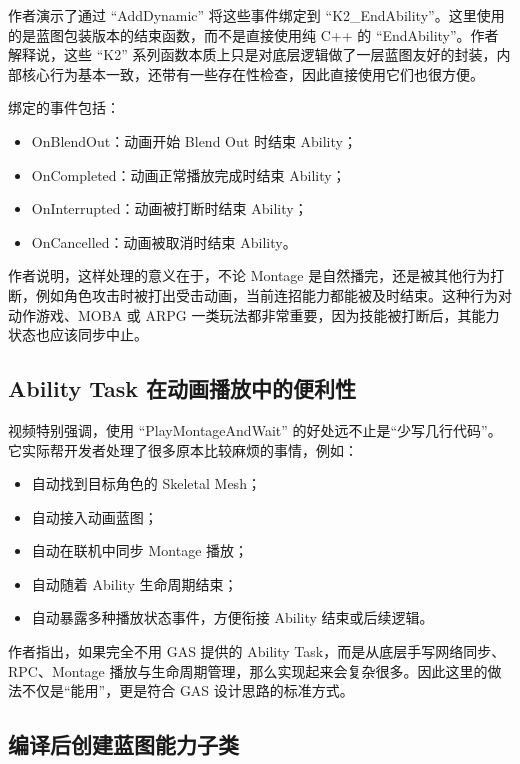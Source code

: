 作者演示了通过 ``AddDynamic'' 将这些事件绑定到 ``K2\_EndAbility''。这里使用的是蓝图包装版本的结束函数，而不是直接使用纯 C++ 的 ``EndAbility''。作者解释说，这些 ``K2'' 系列函数本质上只是对底层逻辑做了一层蓝图友好的封装，内部核心行为基本一致，还带有一些存在性检查，因此直接使用它们也很方便。

绑定的事件包括：

\begin{itemize}
	\item OnBlendOut：动画开始 Blend Out 时结束 Ability；
	\item OnCompleted：动画正常播放完成时结束 Ability；
	\item OnInterrupted：动画被打断时结束 Ability；
	\item OnCancelled：动画被取消时结束 Ability。
\end{itemize}

作者说明，这样处理的意义在于，不论 Montage 是自然播完，还是被其他行为打断，例如角色攻击时被打出受击动画，当前连招能力都能被及时结束。这种行为对动作游戏、MOBA 或 ARPG 一类玩法都非常重要，因为技能被打断后，其能力状态也应该同步中止。

\subsection{Ability Task 在动画播放中的便利性}

视频特别强调，使用 ``PlayMontageAndWait'' 的好处远不止是“少写几行代码”。它实际帮开发者处理了很多原本比较麻烦的事情，例如：

\begin{itemize}
	\item 自动找到目标角色的 Skeletal Mesh；
	\item 自动接入动画蓝图；
	\item 自动在联机中同步 Montage 播放；
	\item 自动随着 Ability 生命周期结束；
	\item 自动暴露多种播放状态事件，方便衔接 Ability 结束或后续逻辑。
\end{itemize}

作者指出，如果完全不用 GAS 提供的 Ability Task，而是从底层手写网络同步、RPC、Montage 播放与生命周期管理，那么实现起来会复杂很多。因此这里的做法不仅是“能用”，更是符合 GAS 设计思路的标准方式。

\subsection{编译后创建蓝图能力子类}

